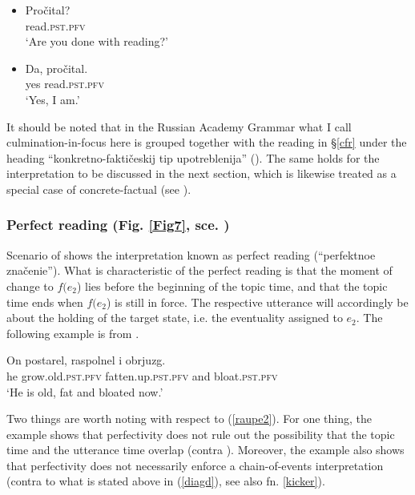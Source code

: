 \documentclass[output=paper,colorlinks,citecolor=brown]{langscibook}
\begin{document}
\ea\label{raupe1}
\begin{itemize}
\item[A:] \gll Pročital?\\
read.\textsc{pst.pfv}\\
\glt `Are you done with reading?'
\item[B:] \gll Da, pročital.\\
yes read.\textsc{pst.pfv}\\
\glt `Yes, I am.' 
\end{itemize}
\z
\noindent It should be noted that 
in the Russian Academy Grammar what I call culmination-in-focus here is grouped together with the reading in \S \ref{cfr} under the heading 
``konkretno-faktičeskij tip upotreblenija'' (\citealt[605]{Svedova1980}). The same holds for
the interpretation to be discussed in the next section, which is likewise treated as a special case of concrete-factual 
(see \citealt[606]{Svedova1980}).

\subsubsection{Perfect reading (Fig. \ref{Fig7}, sce. )}\label{perfect}
Scenario  of  shows the interpretation known as perfect reading (``perfektnoe značenie'').
What is characteristic of the perfect reading is that the moment of change to $f(e_2$) lies before the beginning of the topic time, and that the topic time ends when $f(e_2$) is still in force.
The respective utterance will accordingly be about the holding of the target state, i.e. the eventuality assigned to $e_2$. The following example is from \citet{Svedova1980}.

\ea\label{raupe2}
\gll On postarel, raspolnel i obrjuzg. \\
he grow.old.\textsc{pst.pfv} fatten.up.\textsc{pst.pfv} and bloat.\textsc{pst.pfv}\\ 
\glt `He is old, fat and bloated now.' 
\z 

\noindent Two things are worth noting with respect to (\ref{raupe2}).
For one thing, the example shows that perfectivity does not rule out the possibility that the topic time and the utterance time overlap (contra \citealt{Borik2006}). Moreover, the example also shows that perfectivity does not necessarily enforce a chain-of-events interpretation (contra to what is stated above in (\ref{diagd}), see also fn. \ref{kicker}).   
\end{document}
